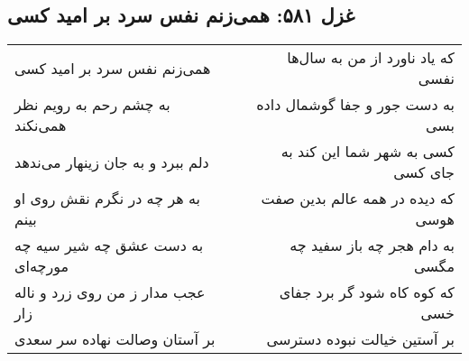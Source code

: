 \begin{center}
\section*{غزل ۵۸۱: همی‌زنم نفس سرد بر امید کسی}
\label{sec:581}
\begin{longtable}{l p{0.5cm} r}
همی‌زنم نفس سرد بر امید کسی
&&
که یاد ناورد از من به سال‌ها نفسی
\\
به چشم رحم به رویم نظر همی‌نکند
&&
به دست جور و جفا گوشمال داده بسی
\\
دلم ببرد و به جان زینهار می‌ندهد
&&
کسی به شهر شما این کند به جای کسی
\\
به هر چه در نگرم نقش روی او بینم
&&
که دیده در همه عالم بدین صفت هوسی
\\
به دست عشق چه شیر سیه چه مورچه‌ای
&&
به دام هجر چه باز سفید چه مگسی
\\
عجب مدار ز من روی زرد و ناله زار
&&
که کوه کاه شود گر برد جفای خسی
\\
بر آستان وصالت نهاده سر سعدی
&&
بر آستین خیالت نبوده دسترسی
\\
\end{longtable}
\end{center}
